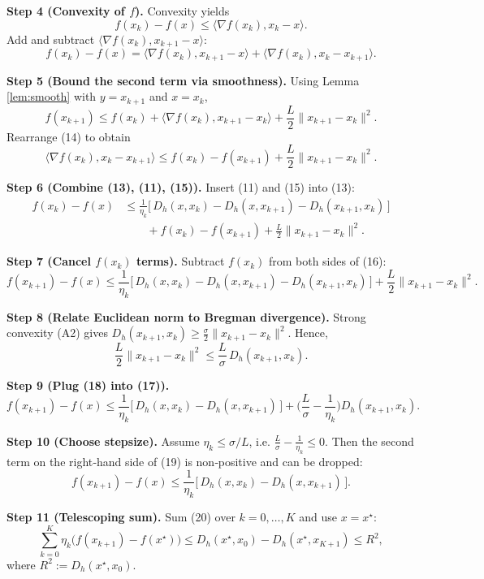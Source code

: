 \documentclass[11pt]{article}
\newcommand{\grad}{\nabla}
\newcommand{\D}{D_{h}}
\newcommand{\inner}[2]{\langle #1,#2\rangle}
\begin{document}
\medskip
\noindent\textbf{Step 4 (Convexity of $f$).}  
Convexity yields
\[
f(x_{k})-f(x)\le\inner{\grad f(x_{k})}{x_{k}-x}.
\tag{12}
\]
Add and subtract $\inner{\grad f(x_{k})}{x_{k+1}-x}$:
\[
f(x_{k})-f(x)
    =\inner{\grad f(x_{k})}{x_{k+1}-x}
      +\inner{\grad f(x_{k})}{x_{k}-x_{k+1}}.
\tag{13}
\]

\medskip
\noindent\textbf{Step 5 (Bound the second term via smoothness).}  
Using Lemma \ref{lem:smooth} with $y=x_{k+1}$ and $x=x_{k}$,
\[
f(x_{k+1})\le f(x_{k})+\inner{\grad f(x_{k})}{x_{k+1}-x_{k}}+\frac{L}{2}\|x_{k+1}-x_{k}\|^{2}.
\tag{14}
\]
Rearrange (14) to obtain
\[
\inner{\grad f(x_{k})}{x_{k}-x_{k+1}}
    \le f(x_{k})-f(x_{k+1})+\frac{L}{2}\|x_{k+1}-x_{k}\|^{2}.
\tag{15}
\]

\medskip
\noindent\textbf{Step 6 (Combine (13), (11), (15)).}  
Insert (11) and (15) into (13):
\[
\begin{aligned}
f(x_{k})-f(x)
&\le \frac{1}{\eta_{k}}\big[\,\D(x,x_{k})-\D(x,x_{k+1})-\D(x_{k+1},x_{k})\,\big] \\
&\qquad + f(x_{k})-f(x_{k+1})+\frac{L}{2}\|x_{k+1}-x_{k}\|^{2}.
\end{aligned}
\tag{16}
\]

\medskip
\noindent\textbf{Step 7 (Cancel $f(x_{k})$ terms).}  
Subtract $f(x_{k})$ from both sides of (16):
\[
f(x_{k+1})-f(x)
\le \frac{1}{\eta_{k}}\big[\,\D(x,x_{k})-\D(x,x_{k+1})-\D(x_{k+1},x_{k})\,\big]
     +\frac{L}{2}\|x_{k+1}-x_{k}\|^{2}.
\tag{17}
\]

\medskip
\noindent\textbf{Step 8 (Relate Euclidean norm to Bregman divergence).}  
Strong convexity (A2) gives $\D(x_{k+1},x_{k})\ge \frac{\sigma}{2}\|x_{k+1}-x_{k}\|^{2}$. Hence,
\[
\frac{L}{2}\|x_{k+1}-x_{k}\|^{2}
\le \frac{L}{\sigma}\,\D(x_{k+1},x_{k}).
\tag{18}
\]

\medskip
\noindent\textbf{Step 9 (Plug (18) into (17)).}
\[
f(x_{k+1})-f(x)
\le \frac{1}{\eta_{k}}\big[\,\D(x,x_{k})-\D(x,x_{k+1})\,\big]
    +\Big(\frac{L}{\sigma}-\frac{1}{\eta_{k}}\Big)\D(x_{k+1},x_{k}).
\tag{19}
\]

\medskip
\noindent\textbf{Step 10 (Choose stepsize).}  
Assume $\eta_{k}\le \sigma/L$, i.e. $\frac{L}{\sigma}-\frac{1}{\eta_{k}}\le0$. Then the second term on the right‑hand side of (19) is non‑positive and can be dropped:
\[
f(x_{k+1})-f(x)
\le \frac{1}{\eta_{k}}\big[\,\D(x,x_{k})-\D(x,x_{k+1})\,\big].
\tag{20}
\]

\medskip
\noindent\textbf{Step 11 (Telescoping sum).}  
Sum (20) over $k=0,\dots,K$ and use $x=x^{\star}$:
\[
\sum_{k=0}^{K}\eta_{k}\big(f(x_{k+1})-f(x^{\star})\big)
    \le \D(x^{\star},x_{0})-\D(x^{\star},x_{K+1})
    \le R^{2},
\tag{21}
\]
where $R^{2}:=\D(x^{\star},x_{0})$.
\end{document}
